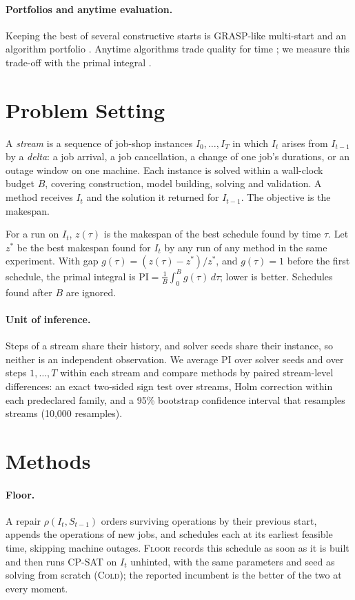 \documentclass[letterpaper]{article} %
\newcommand{\mcold}{\textsc{Cold}}
\newcommand{\mfloor}{\textsc{Floor}}
\begin{document}
\paragraph{Portfolios and anytime evaluation.} Keeping the best of several constructive starts is GRASP-like multi-start \citep{feo1995} and an algorithm portfolio \citep{gomes2001}. Anytime algorithms trade quality for time \citep{dean1988,zilberstein1996}; we measure this trade-off with the primal integral \citep{berthold2013}.

\section{Problem Setting}

A \emph{stream} is a sequence of job-shop instances $I_0,\dots,I_T$ in which $I_t$ arises from $I_{t-1}$ by a \emph{delta}: a job arrival, a job cancellation, a change of one job's durations, or an outage window on one machine. Each instance is solved within a wall-clock budget $B$, covering construction, model building, solving and validation. A method receives $I_t$ and the solution it returned for $I_{t-1}$. The objective is the makespan.

For a run on $I_t$, $z(\tau)$ is the makespan of the best schedule found by time $\tau$. Let $z^*$ be the best makespan found for $I_t$ by any run of any method in the same experiment. With gap $g(\tau)=(z(\tau)-z^*)/z^*$, and $g(\tau)=1$ before the first schedule, the primal integral is $\mathrm{PI}=\frac{1}{B}\int_0^B g(\tau)\,d\tau$; lower is better. Schedules found after $B$ are ignored.

\paragraph{Unit of inference.} Steps of a stream share their history, and solver seeds share their instance, so neither is an independent observation. We average PI over solver seeds and over steps $1,\dots,T$ within each stream and compare methods by paired stream-level differences: an exact two-sided sign test over streams, Holm correction within each predeclared family, and a 95\% bootstrap confidence interval that resamples streams (10{,}000 resamples).

\section{Methods}

\paragraph{Floor.} A repair $\rho(I_t,S_{t-1})$ orders surviving operations by their previous start, appends the operations of new jobs, and schedules each at its earliest feasible time, skipping machine outages. \mfloor{} records this schedule as soon as it is built and then runs CP-SAT on $I_t$ unhinted, with the same parameters and seed as solving from scratch (\mcold); the reported incumbent is the better of the two at every moment.
\end{document}

